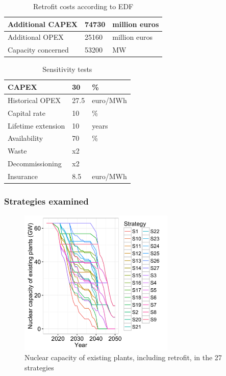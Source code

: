 \begin{table}[!htp]
	\centering
	\caption{Retrofit costs according to EDF}
	\label{tab:costs_grand_carenage}
	\begin{tabular}{lll}
		\toprule
		Additional CAPEX & 74730 & million euros \\
		\midrule
		Additional OPEX & 25160 & million euros \\
		Capacity concerned & 53200 & MW \\
		\bottomrule
	\end{tabular}
\end{table}


\begin{table}[!htp]
	\centering
	\caption{Sensitivity tests}
	\label{tab:sensitivity_tests}
	\begin{tabular}{lll}
		\toprule
		CAPEX & 30 & \% \\
		\midrule
		Historical OPEX & 27.5 & euro/MWh \\
		Capital rate & 10 & \% \\
		Lifetime extension & 10 & years \\
		Availability & 70 & \% \\
		Waste & x2 &  \\
		Decommissioning & x2 &  \\
		Insurance & 8.5 & euro/MWh \\
		\bottomrule
	\end{tabular}
\end{table}

\clearpage

\subsubsection{Strategies examined}
\label{sec:strategies_examined}

\begin{figure}[!htp]
	\centering
	\includegraphics[height=7cm]{figures/strategies.png}
	\caption{Nuclear capacity of existing plants, including retrofit, in the 27 strategies}
	\label{fig:strategies}
\end{figure}

